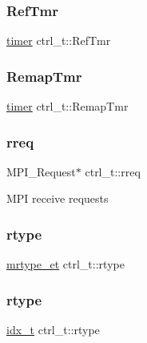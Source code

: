\subsubsection{\texorpdfstring{Ref\+Tmr}{RefTmr}\hspace{0.1cm}{\footnotesize\ttfamily [2/2]}}
{\footnotesize\ttfamily \hyperlink{a00978_aae821c36bb7e6918e1414484f939c3d4}{timer} ctrl\+\_\+t\+::\+Ref\+Tmr}

\mbox{\label{a00742_a09be4dee7850678b5e247eba855786a8}} 
\subsubsection{\texorpdfstring{Remap\+Tmr}{RemapTmr}}
{\footnotesize\ttfamily \hyperlink{a00978_aae821c36bb7e6918e1414484f939c3d4}{timer} ctrl\+\_\+t\+::\+Remap\+Tmr}

\mbox{\label{a00742_a8cead6c0236b648ce4a71266614595ac}} 
\subsubsection{\texorpdfstring{rreq}{rreq}}
{\footnotesize\ttfamily M\+P\+I\+\_\+\+Request$\ast$ ctrl\+\_\+t\+::rreq}

M\+PI receive requests \mbox{\label{a00742_a9a5e805fb214f1073f147f28f547201a}} 
\subsubsection{\texorpdfstring{rtype}{rtype}\hspace{0.1cm}{\footnotesize\ttfamily [1/2]}}
{\footnotesize\ttfamily \hyperlink{a00876_a54ec0069de1eb28daca5cf43617e57e4}{mrtype\+\_\+et} ctrl\+\_\+t\+::rtype}

\mbox{\label{a00742_a00222ee6848f108df74b350480e9691f}} 
\subsubsection{\texorpdfstring{rtype}{rtype}\hspace{0.1cm}{\footnotesize\ttfamily [2/2]}}
{\footnotesize\ttfamily \hyperlink{a00876_aaa5262be3e700770163401acb0150f52}{idx\+\_\+t} ctrl\+\_\+t\+::rtype}

